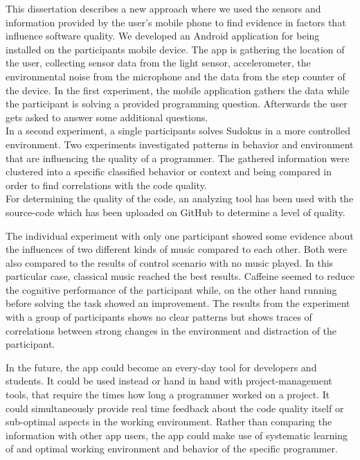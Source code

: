 \bigbreak
This dissertation describes a new approach where we used the sensors and information provided by the user's mobile phone to find evidence in factors that influence software quality. 
We developed an Android application for being installed on the participants mobile device. The app is gathering the location of the user, collecting sensor data from the light sensor, accelerometer, the environmental noise from the microphone and the data from the step counter of the device. \bigbreak
In the first experiment, the mobile application gathers the data while the participant is solving a provided programming question. 
Afterwards the user gets asked to answer some additional questions. \\
In a second experiment, a single participants solves Sudokus in a more controlled environment. 
Two experiments investigated patterns in behavior and environment that are influencing the quality of a programmer. The gathered information were clustered into a specific classified behavior or context and being compared in order to find correlations with the code quality.\\
For determining the quality of the code, an analyzing tool has been used with the source-code which has been uploaded on GitHub to determine a level of quality.
\bigbreak

The individual experiment with only one participant showed some evidence about the influences of two different kinds of music compared to each other. Both were also compared to the results of control scenario with no music played. In this particular case, classical music reached the best results. Caffeine seemed to reduce the cognitive performance of the participant while, on the other hand running before solving the task showed an improvement.
The results from the experiment with a group of participants shows no clear patterns but shows traces of correlations between strong changes in the environment and distraction of the participant.  

\bigbreak
In the future, the app could become an every-day tool for developers and students. It could be used instead or hand in hand with project-management tools, that require the times how long a programmer worked on a project. It could simultaneously provide real time feedback about the code quality itself or sub-optimal aspects in the working environment. Rather than comparing the information with other app users, the app could make use of systematic learning of and optimal working environment and behavior of the specific programmer.

